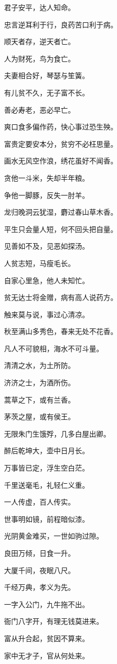 \documentclass[12pt,oneside]{book}
\begin{document}
君子安平，达人知命。

忠言逆耳利于行，良药苦口利于病。

顺天者存，逆天者亡。

人为财死，鸟为食亡。

夫妻相合好，琴瑟与笙簧。

有儿贫不久，无子富不长。

善必寿老，恶必早亡。

爽口食多偏作药，快心事过恐生殃。

富贵定要安本分，贫穷不必枉思量。

画水无风空作浪，绣花虽好不闻香。

贪他一斗米，失却半年粮。

争他一脚豚，反失一肘羊。

龙归晚洞云犹湿，麝过春山草木香。

平生只会量人短，何不回头把自量。

见善如不及，见恶如探汤。

人贫志短，马瘦毛长。

自家心里急，他人未知忙。

贫无达士将金赠，病有高人说药方。

触来莫与说，事过心清凉。

秋至满山多秀色，春来无处不花香。

凡人不可貌相，海水不可斗量。

清清之水，为土所防。

济济之士，为酒所伤。

蒿草之下，或有兰香。

茅茨之屋，或有侯王。

无限朱门生饿殍，几多白屋出卿。

醉后乾坤大，壶中日月长。

万事皆已定，浮生空白茫。

千里送毫毛，礼轻仁义重。

一人传虚，百人传实。

世事明如镜，前程暗似漆。

光阴黄金难买，一世如驹过隙。

良田万倾，日食一升。

大厦千间，夜眠八尺。

千经万典，孝义为先。

一字入公门，九牛拖不出。

衙门八字开，有理无钱莫进来。

富从升合起，贫因不算来。

家中无才子，官从何处来。
\end{document}
